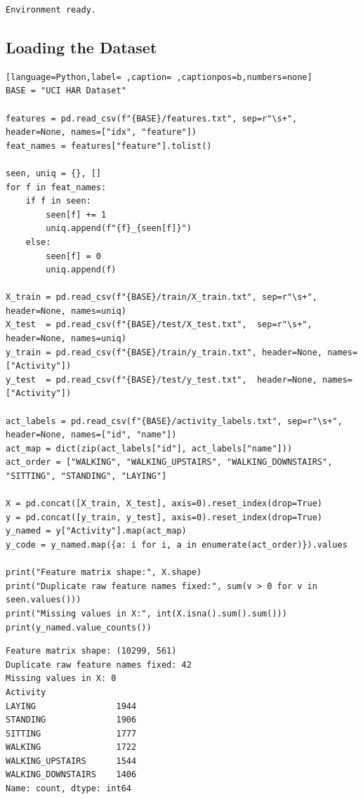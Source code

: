 \documentclass[12pt,a4paper]{article}
\begin{document}
\begin{verbatim}
Environment ready.
\end{verbatim}

\subsection{Loading the Dataset}
\label{sec:org43b83f1}

\begin{lstlisting}[language=Python,label= ,caption= ,captionpos=b,numbers=none]
BASE = "UCI HAR Dataset"

features = pd.read_csv(f"{BASE}/features.txt", sep=r"\s+", header=None, names=["idx", "feature"])
feat_names = features["feature"].tolist()

seen, uniq = {}, []
for f in feat_names:
    if f in seen:
        seen[f] += 1
        uniq.append(f"{f}_{seen[f]}")
    else:
        seen[f] = 0
        uniq.append(f)

X_train = pd.read_csv(f"{BASE}/train/X_train.txt", sep=r"\s+", header=None, names=uniq)
X_test  = pd.read_csv(f"{BASE}/test/X_test.txt",  sep=r"\s+", header=None, names=uniq)
y_train = pd.read_csv(f"{BASE}/train/y_train.txt", header=None, names=["Activity"])
y_test  = pd.read_csv(f"{BASE}/test/y_test.txt",  header=None, names=["Activity"])

act_labels = pd.read_csv(f"{BASE}/activity_labels.txt", sep=r"\s+", header=None, names=["id", "name"])
act_map = dict(zip(act_labels["id"], act_labels["name"]))
act_order = ["WALKING", "WALKING_UPSTAIRS", "WALKING_DOWNSTAIRS", "SITTING", "STANDING", "LAYING"]

X = pd.concat([X_train, X_test], axis=0).reset_index(drop=True)
y = pd.concat([y_train, y_test], axis=0).reset_index(drop=True)
y_named = y["Activity"].map(act_map)
y_code = y_named.map({a: i for i, a in enumerate(act_order)}).values

print("Feature matrix shape:", X.shape)
print("Duplicate raw feature names fixed:", sum(v > 0 for v in seen.values()))
print("Missing values in X:", int(X.isna().sum().sum()))
print(y_named.value_counts())
\end{lstlisting}

\begin{verbatim}
Feature matrix shape: (10299, 561)
Duplicate raw feature names fixed: 42
Missing values in X: 0
Activity
LAYING                1944
STANDING              1906
SITTING               1777
WALKING               1722
WALKING_UPSTAIRS      1544
WALKING_DOWNSTAIRS    1406
Name: count, dtype: int64
\end{verbatim}
\end{document}
